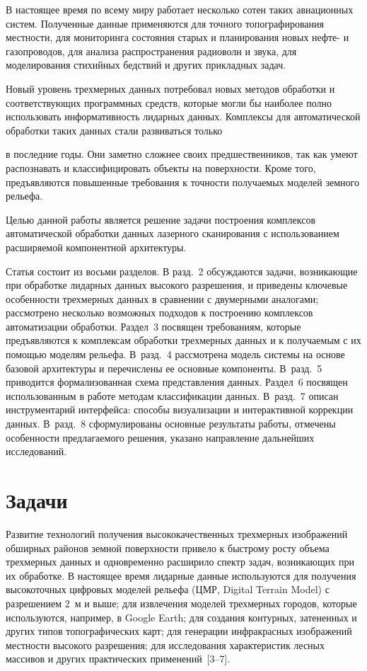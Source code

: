 \begin{multicols}{2}
В  настоящее время по всему миру работает несколько сотен таких авиационных 
сис\-тем. Полученные данные применяются для точного топографирования 
местности, для мониторинга состояния старых и планирования новых нефте- и 
газопроводов, для анализа распространения радиоволн и звука, для 
моделирования стихийных бедствий и других прикладных задач.
   
   Новый уровень трехмерных данных потребовал новых методов обработки и 
соответствующих программных средств, которые могли бы наиболее полно 
использовать информативность лидарных данных. Комплексы для 
автоматической обработки таких данных стали развиваться только\linebreak\vspace*{-12pt}
\pagebreak

\noindent
 в последние годы. Они заметно сложнее своих предшественников, так как умеют 
распознавать и классифицировать объекты на поверхности. Кроме того, 
предъявляются повышенные требования к точ\-ности получаемых моделей 
земного рельефа. 
   
   Целью данной работы является решение задачи построения комплексов 
автоматической обработки данных лазерного сканирования с использованием 
расширяемой компонентной архитектуры.
   
   Статья состоит из восьми разделов. В разд.~2 обсуждаются задачи, 
возникающие при обработке лидарных данных высокого разрешения, и 
приведены ключевые особенности трехмерных данных в сравнении с двумерными 
аналогами; рассмотрено несколько возможных подходов к построению 
комплексов автоматизации обработки. Раздел~3 посвящен требованиям, 
которые предъявляются к комплексам обработки трехмерных данных и к 
получаемым с их помощью моделям рельефа. В~разд.~4 рас\-смот\-ре\-на модель 
системы на основе базовой архитектуры и перечислены ее основные 
компоненты. В~разд.~5 приводится формализованная схема представления 
данных. Раздел~6 посвящен использованным в работе методам классификации 
данных. В~разд.~7 описан инструментарий интерфейса: способы визуализации 
и интерактивной коррекции данных. В~разд.~8 
сформулированы основные результаты работы, отмечены особенности 
предлагаемого решения, указано направление дальнейших исследований.


\section{Задачи}


   Развитие технологий получения высококачественных трехмерных 
изображений обширных районов земной поверхности привело к быстрому 
рос\-ту объема трехмерных данных и одновременно расширило спектр задач, 
возникающих при их обработке. В настоящее время лидарные данные 
используются для получения высокоточных цифровых моделей рель\-ефа (ЦМР, 
Digital Terrain Model) с разрешением 2~м и выше; для извлечения моделей 
трехмерных городов, которые используются, например, в Google Earth; для 
создания контурных, затененных и других типов топографических карт; для 
генерации инфракрасных изображений местности высокого разрешения; для 
исследования характеристик лесных массивов и других практических 
применений~[3--7].
   

\end{multicols}
